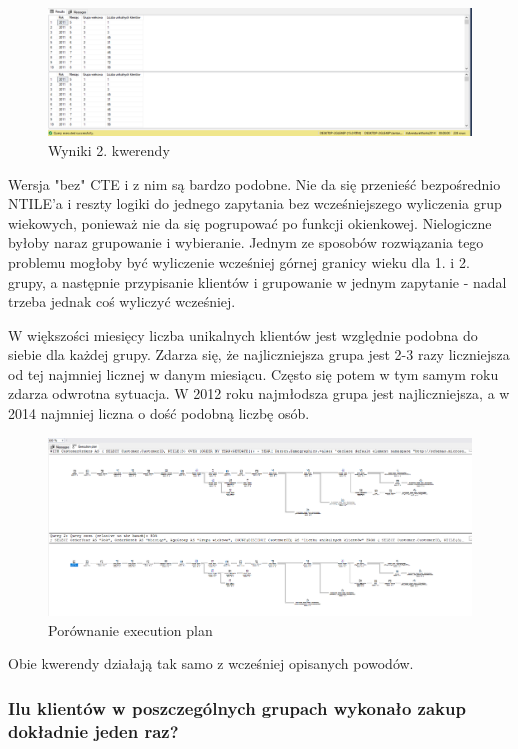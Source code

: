\documentclass[a4paper,12pt]{article}
\begin{document}
\begin{figure}[H]
	\centering
	\includegraphics[width=1.0\textwidth]{images/2.png}
	\caption{Wyniki 2. kwerendy}
\end{figure}

Wersja "bez" CTE i z nim są bardzo podobne. Nie da się przenieść bezpośrednio NTILE'a i reszty logiki do jednego zapytania bez wcześniejszego wyliczenia grup wiekowych, ponieważ nie da się pogrupować po funkcji okienkowej. Nielogiczne byłoby naraz grupowanie i wybieranie. Jednym ze sposobów rozwiązania tego problemu mogłoby być wyliczenie wcześniej górnej granicy wieku dla 1. i 2. grupy, a następnie przypisanie klientów i grupowanie w jednym zapytanie - nadal trzeba jednak coś wyliczyć wcześniej.

W większości miesięcy liczba unikalnych klientów jest względnie podobna do siebie dla każdej grupy. Zdarza się, że najliczniejsza grupa jest 2-3 razy liczniejsza od tej najmniej licznej w danym miesiącu. Często się potem w tym samym roku zdarza odwrotna sytuacja. W 2012 roku najmłodsza grupa jest najliczniejsza, a w 2014 najmniej liczna o dość podobną liczbę osób.

\begin{figure}[H]
	\centering
	\includegraphics[width=1.0\textwidth]{images/2_execution_plan.png}
	\caption{Porównanie execution plan}
\end{figure}

Obie kwerendy działają tak samo z wcześniej opisanych powodów.

\subsubsection{Ilu klientów w poszczególnych grupach wykonało zakup dokładnie jeden raz?}
\end{document}
